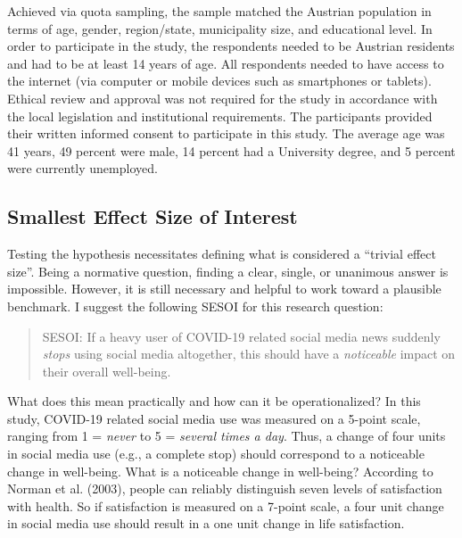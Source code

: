 \documentclass[
  man,mask,floatsintext]{apa7}
\begin{document}
Achieved via quota sampling, the sample matched the Austrian population in terms of age, gender, region/state, municipality size, and educational level.
In order to participate in the study, the respondents needed to be Austrian residents and had to be at least 14 years of age.
All respondents needed to have access to the internet (via computer or mobile devices such as smartphones or tablets).
Ethical review and approval was not required for the study in accordance with the local legislation and institutional requirements.
The participants provided their written informed consent to participate in this study.
The average age was 41 years, 49 percent were male, 14 percent had a University degree, and 5 percent were currently unemployed.

\hypertarget{smallest-effect-size-of-interest}{%
\subsection{Smallest Effect Size of Interest}\label{smallest-effect-size-of-interest}}

Testing the hypothesis necessitates defining what is considered a ``trivial effect size''.
Being a normative question, finding a clear, single, or unanimous answer is impossible.
However, it is still necessary and helpful to work toward a plausible benchmark.
I suggest the following SESOI for this research question:

\begin{quote}
SESOI: If a heavy user of COVID-19 related social media news suddenly \emph{stops} using social media altogether, this should have a \emph{noticeable} impact on their overall well-being.
\end{quote}

What does this mean practically and how can it be operationalized?
In this study, COVID-19 related social media use was measured on a 5-point scale, ranging from 1 = \emph{never} to 5 = \emph{several times a day}. Thus, a change of four units in social media use (e.g., a complete stop) should correspond to a noticeable change in well-being.
What is a noticeable change in well-being?
According to Norman et al. (2003), people can reliably distinguish seven levels of satisfaction with health.
So if satisfaction is measured on a 7-point scale, a four unit change in social media use should result in a one unit change in life satisfaction.
\end{document}
